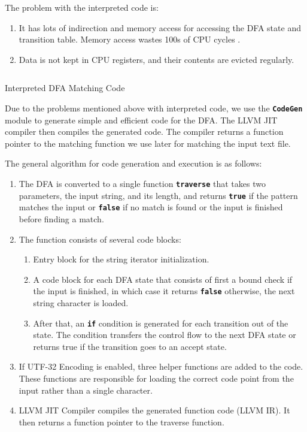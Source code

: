 The problem with the interpreted code is:
\begin{enumerate}
    \item It has lots of indirection and memory access for accessing the DFA state and transition table. Memory access wastes 100s of CPU cycles \cite{cpumemgap}.
    \item Data is not kept in CPU registers, and their contents are evicted regularly.
\end{enumerate}

\begin{listing}[htbp]
\inputminted[breaklines=true,frame=lines,linenos]{cpp}{code/interpretted.cpp}
\caption[Interpreted DFA Code]{Interpreted DFA Matching Code}
\label{lst:dfainterpreted}
\end{listing}

Due to the problems mentioned above with interpreted code, we use the \texttt{\textbf{CodeGen}} module to generate simple and efficient code for the DFA. The LLVM JIT compiler then compiles the generated code. The compiler returns a function pointer to the matching function we use later for matching the input text file.

The general algorithm for code generation and execution is as follows:
\begin{enumerate}
    \item The DFA is converted to a single function \texttt{\textbf{traverse}} that takes two parameters, the input string, and its length, and returns \texttt{\textbf{true}} if the pattern matches the input or \texttt{\textbf{false}} if no match is found or the input is finished before finding a match.
    \item The function consists of several code blocks:
    \begin{enumerate}
        \item Entry block for the string iterator initialization.
        \item A code block for each DFA state that consists of first a bound check if the input is finished, in which case it returns \texttt{\textbf{false}} otherwise, the next string character is loaded.
        \item After that, an \texttt{\textbf{if}} condition is generated for each transition out of the state. The condition transfers the control flow to the next DFA state or returns true if the transition goes to an accept state.
    \end{enumerate}
    \item If UTF-32 Encoding is enabled, three helper functions are added to the code. These functions are responsible for loading the correct code point from the input rather than a single character.
    \item LLVM JIT Compiler compiles the generated function code (LLVM IR). It then returns a function pointer to the traverse function.
\end{enumerate}

